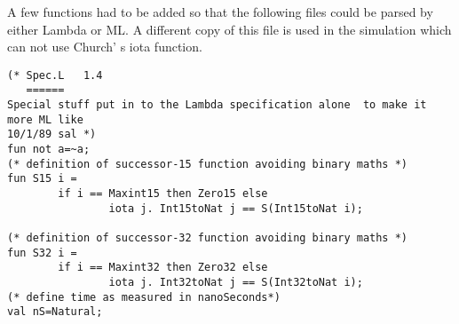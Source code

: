 A few functions had to be added so that the following files could be parsed by either Lambda or ML.
A different copy of this file is used in the simulation which can not use Church' s iota function.
\begin{verbatim}
(* Spec.L	1.4
   ======
Special stuff put in to the Lambda specification alone  to make it more ML like
10/1/89 sal *)
fun not a=~a;
(* definition of successor-15 function avoiding binary maths *)
fun S15 i =
        if i == Maxint15 then Zero15 else
                iota j. Int15toNat j == S(Int15toNat i);

(* definition of successor-32 function avoiding binary maths *)
fun S32 i =
        if i == Maxint32 then Zero32 else
                iota j. Int32toNat j == S(Int32toNat i);
(* define time as measured in nanoSeconds*)
val nS=Natural;
\end{verbatim}
